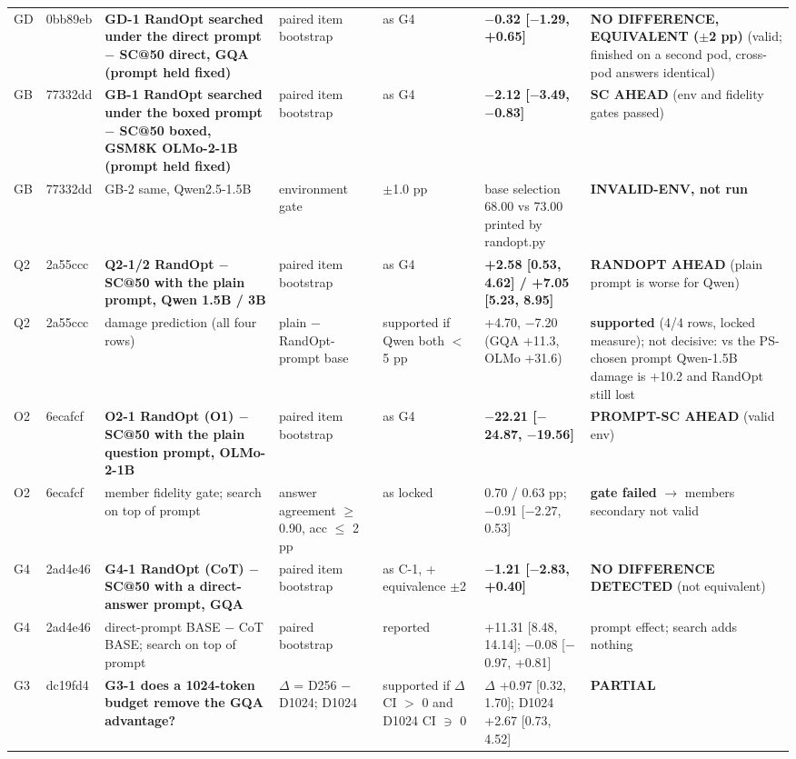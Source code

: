 \begin{longtable}{p{1.2cm}p{1.3cm}p{3.8cm}p{2.1cm}p{2.1cm}p{2.4cm}p{2.7cm}}
GD & 0bb89eb & \textbf{GD-1 RandOpt searched under the direct prompt $-$ SC@50 direct, GQA (prompt held fixed)} & paired item bootstrap & as G4 & \textbf{$-$0.32 [$-$1.29, +0.65]} & \textbf{NO DIFFERENCE, EQUIVALENT ($\pm$2 pp)} (valid; finished on a second pod, cross-pod answers identical) \\
GB & 77332dd & \textbf{GB-1 RandOpt searched under the boxed prompt $-$ SC@50 boxed, GSM8K OLMo-2-1B (prompt held fixed)} & paired item bootstrap & as G4 & \textbf{$-$2.12 [$-$3.49, $-$0.83]} & \textbf{SC AHEAD} (env and fidelity gates passed) \\
GB & 77332dd & GB-2 same, Qwen2.5-1.5B & environment gate & $\pm$1.0 pp & base selection 68.00 vs 73.00 printed by randopt.py & \textbf{INVALID-ENV, not run} \\
Q2 & 2a55ccc & \textbf{Q2-1/2 RandOpt $-$ SC@50 with the plain prompt, Qwen 1.5B / 3B} & paired item bootstrap & as G4 & \textbf{+2.58 [0.53, 4.62] / +7.05 [5.23, 8.95]} & \textbf{RANDOPT AHEAD} (plain prompt is worse for Qwen) \\
Q2 & 2a55ccc & damage prediction (all four rows) & plain $-$ RandOpt-prompt base & supported if Qwen both $<$ 5 pp & +4.70, $-$7.20 (GQA +11.3, OLMo +31.6) & \textbf{supported} (4/4 rows, locked measure); not decisive: vs the PS-chosen prompt Qwen-1.5B damage is +10.2 and RandOpt still lost \\
O2 & 6ecafcf & \textbf{O2-1 RandOpt (O1) $-$ SC@50 with the plain question prompt, OLMo-2-1B} & paired item bootstrap & as G4 & \textbf{$-$22.21 [$-$24.87, $-$19.56]} & \textbf{PROMPT-SC AHEAD} (valid env) \\
O2 & 6ecafcf & member fidelity gate; search on top of prompt & answer agreement $\ge$ 0.90, acc $\le$ 2 pp & as locked & 0.70 / 0.63 pp; $-$0.91 [$-$2.27, 0.53] & \textbf{gate failed} $\rightarrow$ members secondary not valid \\
G4 & 2ad4e46 & \textbf{G4-1 RandOpt (CoT) $-$ SC@50 with a direct-answer prompt, GQA} & paired item bootstrap & as C-1, + equivalence $\pm$2 & \textbf{$-$1.21 [$-$2.83, +0.40]} & \textbf{NO DIFFERENCE DETECTED} (not equivalent) \\
G4 & 2ad4e46 & direct-prompt BASE $-$ CoT BASE; search on top of prompt & paired bootstrap & reported & +11.31 [8.48, 14.14]; $-$0.08 [$-$0.97, +0.81] & prompt effect; search adds nothing \\
G3 & dc19fd4 & \textbf{G3-1 does a 1024-token budget remove the GQA advantage?} & $\Delta$ = D256 $-$ D1024; D1024 & supported if $\Delta$ CI $>$ 0 and D1024 CI $\ni$ 0 & $\Delta$ +0.97 [0.32, 1.70]; D1024 +2.67 [0.73, 4.52] & \textbf{PARTIAL} \\

\end{longtable}

